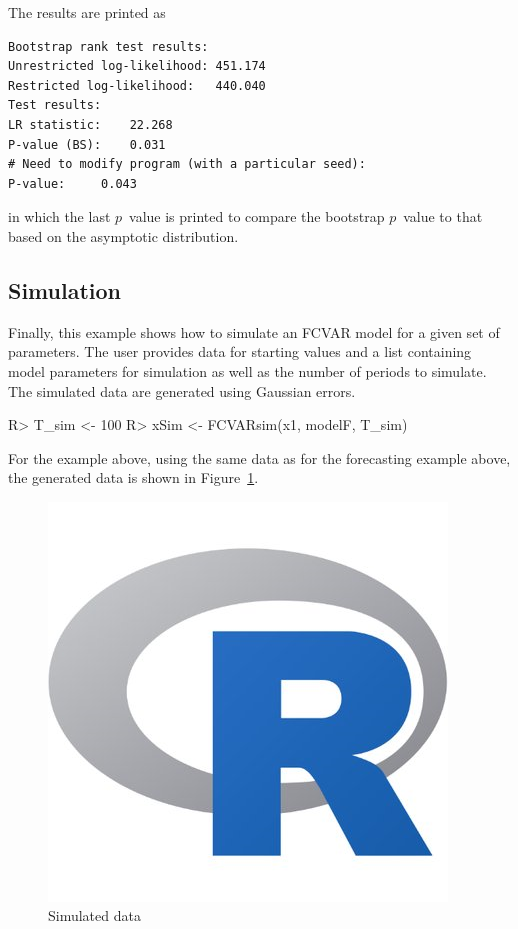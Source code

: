 \documentclass[article]{jss}
\begin{document}
The results are printed as
\begin{verbatim}
Bootstrap rank test results:
Unrestricted log-likelihood: 451.174
Restricted log-likelihood:   440.040
Test results:
LR statistic: 	 22.268
P-value (BS): 	 0.031
# Need to modify program (with a particular seed):
P-value: 	 0.043
\end{verbatim}
in which the last $p$~value is printed to compare the bootstrap $p$~value to that based on the asymptotic distribution. 

\subsection{Simulation}
\label{sec:simulation}

Finally, 
this example
shows how to simulate an FCVAR model for a given set of parameters. The user provides data for starting values and a list containing model parameters for simulation as well as the number of periods to simulate. The simulated data are generated using Gaussian errors.

\begin{Code}
R> T_sim <- 100
R> xSim <- FCVARsim(x1, modelF, T_sim)
\end{Code}

For the example above, 
using the same data as for the forecasting example above, 
the generated data is shown in Figure~\ref{fig:sim}.

\begin{figure}[tbh]
  \centering
  \includegraphics[scale = 1, keepaspectratio=true]{Figures/sim.png}
  \caption{Simulated data}
  \label{fig:sim}
\end{figure}
\end{document}
